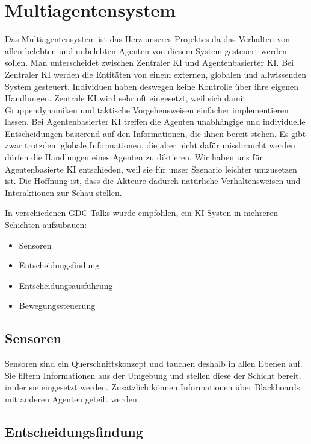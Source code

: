 \section{Multiagentensystem}

Das Multiagentensystem ist das Herz unseres Projektes da das Verhalten von allen belebten und unbelebten Agenten von diesem System gesteuert werden sollen. Man unterscheidet zwischen Zentraler KI und Agentenbasierter KI. Bei Zentraler KI werden die Entitäten von einem externen, globalen und allwissenden System gesteuert. Individuen haben deswegen keine Kontrolle über ihre eigenen Handlungen. Zentrale KI wird sehr oft eingesetzt, weil sich damit Gruppendynamiken und taktische Vorgehensweisen einfacher implementieren lassen. Bei Agentenbasierter KI treffen die Agenten unabhängige und individuelle Entscheidungen basierend auf den Informationen, die ihnen bereit stehen. Es gibt zwar trotzdem globale Informationen, die aber nicht dafür missbraucht werden dürfen die Handlungen eines Agenten zu diktieren. Wir haben uns für Agentenbasierte KI entschieden, weil sie für unser Szenario leichter umzusetzen ist. Die Hoffnung ist, dass die Akteure dadurch natürliche Verhaltensweisen und Interaktionen zur Schau stellen.

In verschiedenen GDC \cite{YouTube_2019}\cite{YouTube_2022}\cite{YouTube_2023} Talks wurde empfohlen, ein KI-Systen in mehreren Schichten aufzubauen:

\begin{itemize}
\item Sensoren
\item Entscheidungsfindung
\item Entscheidungsausführung
\item Bewegungssteuerung
\end{itemize}

\subsection{Sensoren}

Sensoren sind ein Querschnittskonzept und tauchen deshalb in allen Ebenen auf. Sie filtern Informationen aus der Umgebung und stellen diese der Schicht bereit, in der sie eingesetzt werden. Zusätzlich können Informationen über Blackboards mit anderen Agenten geteilt werden.

\subsection{Entscheidungsfindung}

